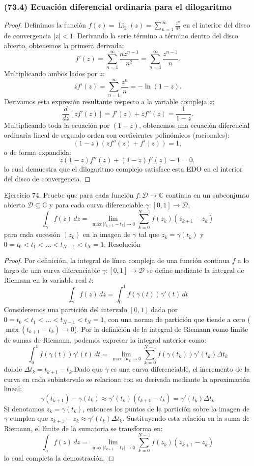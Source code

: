 \documentclass[11pt,a4paper]{article}
\theoremstyle{definition}
\theoremstyle{plain}
\theoremstyle{remark}
\begin{document}
	\subsubsection*{(73.4) Ecuación diferencial ordinaria para el dilogaritmo}
	\begin{proof}
		Definimos la función $f(z) = \operatorname{Li}_2(z) = \sum_{n=1}^\infty \frac{z^n}{n^2}$ en el interior del disco de convergencia $|z| < 1$. Derivando la serie término a término dentro del disco abierto, obtenemos la primera derivada:
		\[
		f'(z) = \sum_{n=1}^\infty \frac{n z^{n-1}}{n^2} = \sum_{n=1}^\infty \frac{z^{n-1}}{n}.
		\]
		Multiplicando ambos lados por $z$:
		\[
		z f'(z) = \sum_{n=1}^\infty \frac{z^n}{n} = -\ln(1-z).
		\]
		Derivamos esta expresión resultante respecto a la variable compleja $z$:
		\[
		\frac{d}{dz} [z f'(z)] = f'(z) + z f''(z) = \frac{1}{1-z}.
		\]
		Multiplicando toda la ecuación por $(1-z)$, obtenemos una ecuación diferencial ordinaria lineal de segundo orden con coeficientes polinómicos (racionales):
		\[
		(1-z) \left( z f''(z) + f'(z) \right) = 1,
		\]
		o de forma expandida:
		\[
		z(1-z) f''(z) + (1-z) f'(z) - 1 = 0,
		\]
		lo cual demuestra que el dilogaritmo complejo satisface esta EDO en el interior del disco de convergencia.
	\end{proof}
	

	Ejercicio 74. Pruebe que para cada función $f : \mathcal{D} \to \mathbb{C}$ continua en un subconjunto abierto $\mathcal{D} \subseteq \mathbb{C}$ y para cada curva diferenciable $\gamma : [0, 1] \to \mathcal{D}$,   $$\int_\gamma f(z) \, dz = \lim_{\max \vert{}t_{k+1} - t_k\vert{} \to 0} \sum_{k=0}^{N-1} f(z_k)(z_{k+1} - z_k)$$   
	para cada sucesión $(z_k)$ en la imagen de $\gamma$ tal que $z_k = \gamma(t_k)$ y $0 = t_0 < t_1 < \dots < t_{N-1} < t_N = 1$.   Resolución
	\begin{proof}
		Por definición, la integral de línea compleja de una función continua $f$ a lo largo de una curva diferenciable $\gamma : [0, 1] \to \mathcal{D}$ se define mediante la integral de Riemann en la variable real $t$:$$\int_\gamma f(z) \, dz = \int_0^1 f(\gamma(t)) \gamma'(t) \, dt$$Consideremos una partición del intervalo $[0, 1]$ dada por $0 = t_0 < t_1 < \dots < t_{N-1} < t_N = 1$, con una norma de partición que tiende a cero ($\max (t_{k+1} - t_k) \to 0$). Por la definición de la integral de Riemann como límite de sumas de Riemann, podemos expresar la integral anterior como:$$\int_0^1 f(\gamma(t)) \gamma'(t) \, dt = \lim_{\max \Delta t_k \to 0} \sum_{k=0}^{N-1} f(\gamma(t_k)) \gamma'(t_k) \Delta t_k$$donde $\Delta t_k = t_{k+1} - t_k$.Dado que $\gamma$ es una curva diferenciable, el incremento de la curva en cada subintervalo se relaciona con su derivada mediante la aproximación lineal:$$\gamma(t_{k+1}) - \gamma(t_k) \approx \gamma'(t_k)(t_{k+1} - t_k) = \gamma'(t_k) \Delta t_k$$Si denotamos $z_k = \gamma(t_k)$, entonces los puntos de la partición sobre la imagen de $\gamma$ cumplen que $z_{k+1} - z_k \approx \gamma'(t_k) \Delta t_k$. Sustituyendo esta relación en la suma de Riemann, el límite de la sumatoria se transforma en:$$\int_\gamma f(z) \, dz = \lim_{\max \vert{}t_{k+1} - t_k\vert{} \to 0} \sum_{k=0}^{N-1} f(z_k)(z_{k+1} - z_k)$$lo cual completa la demostración.
	\end{proof}
	
\end{document}
